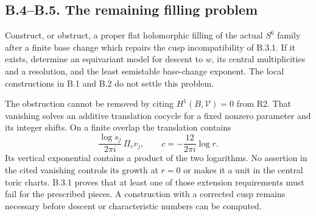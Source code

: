 

\subsection{B.4--B.5. The remaining filling problem}

\begin{problem}[B.4.1; Open]\label{push:B41}
Construct, or obstruct, a proper flat
holomorphic filling of the actual $S^6$
family after a finite base change which
repairs the cusp incompatibility of B.3.1.
If it exists, determine an equivariant
model for descent to $w$, its central
multiplicities and a resolution, and the
least semistable base-change exponent.
The local constructions in B.1 and B.2
do not settle this problem.
\end{problem}

The obstruction cannot be removed by citing
$H^1(B,\mathcal V)=0$ from R2. That
vanishing solves an additive translation
cocycle for a fixed nonzero parameter and
its integer shifts. On a finite overlap
the translation contains
\[
 \frac{\log s_j}{2\pi i}\,\Pi_c v_j,
 \qquad c=-\frac{12}{2\pi i}\log r.
\]
Its vertical exponential contains a product
of the two logarithms. No assertion in
the cited vanishing controls its growth
at $r=0$ or makes it a unit in the central
toric charts. B.3.1 proves that at least
one of those extension requirements must
fail for the prescribed pieces. A
construction with a corrected cusp remains
necessary before descent or characteristic
numbers can be computed.

